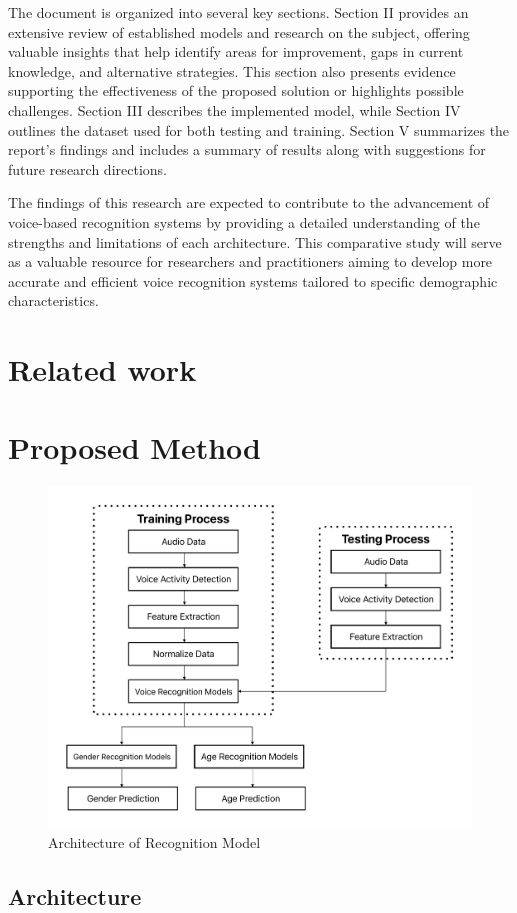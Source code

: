 \documentclass[conference, 10pt]{IEEEtran}
\begin{document}
The document is organized into several key sections. Section II provides an extensive review of established models and research on the subject, offering valuable insights that help identify areas for improvement, gaps in current knowledge, and alternative strategies. This section also presents evidence supporting the effectiveness of the proposed solution or highlights possible challenges. Section III describes the implemented model, while Section IV outlines the dataset used for both testing and training. Section V summarizes the report's findings and includes a summary of results along with suggestions for future research directions.

The findings of this research are expected to contribute to the advancement of voice-based recognition systems by providing a detailed understanding of the strengths and limitations of each architecture. This comparative study will serve as a valuable resource for researchers and practitioners aiming to develop more accurate and efficient voice recognition systems tailored to specific demographic characteristics.
\section{Related work}

\section{Proposed Method}
\begin{figure}
    \centering
    \includegraphics[width=3.5 in]{Research Architecture.pdf}
    \caption{Architecture of Recognition Model}
    \label{fig:Research Architecture}
\end{figure}
\subsection{Architecture}
\end{document}
